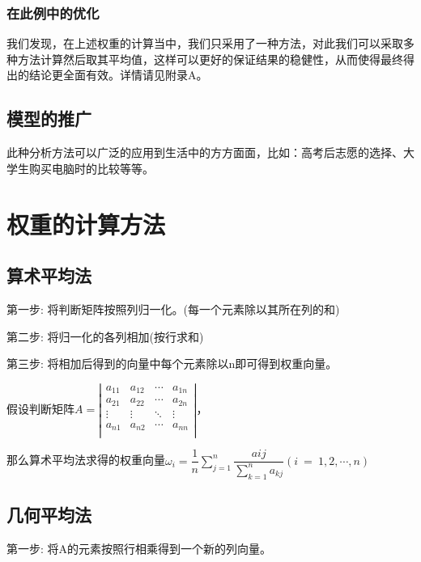 \documentclass[a4paper]{article}
\begin{document}
    \subsubsection{在此例中的优化}
    我们发现，在上述权重的计算当中，我们只采用了一种方法，对此我们可以采取多种方法计算然后取其平均值，这样可以更好的保证结果的稳健性，从而使得最终得出的结论更全面有效。详情请见附录A。
    \subsection{模型的推广}
    此种分析方法可以广泛的应用到生活中的方方面面，比如：高考后志愿的选择、大学生购买电脑时的比较等等。
    
    
    \newpage
    \appendix 

%        
    \section{权重的计算方法}
    \subsection{算术平均法}
    第一步: 将判断矩阵按照列归一化。(每一个元素除以其所在列的和)
    
    第二步: 将归一化的各列相加(按行求和) 
    
    第三步: 将相加后得到的向量中每个元素除以n即可得到权重向量。
    
    假设判断矩阵$ A= 
    \left| \begin{matrix}
        a_{11}&		a_{12}&		\cdots&		a_{1n}\\
        a_{21}&		a_{22}&		\cdots&		a_{2n}\\
        \vdots&		\vdots&		\ddots&		\vdots\\
        a_{n1}&		a_{n2}&		\cdots&		a_{nn}\\
    \end{matrix} \right|
    $，
    
    那么算术平均法求得的权重向量$ \omega_{i} = \dfrac{1}{n}\sum\limits_{j=1}^n{\dfrac{a{ij}}{\sum\limits_{k=1}^n{a_{kj}}}}\left( i\ =\ 1,2,\cdots ,n \right) 
    $
    \subsection{几何平均法}
    第一步: 将A的元素按照行相乘得到一个新的列向量。
    
\end{document}
